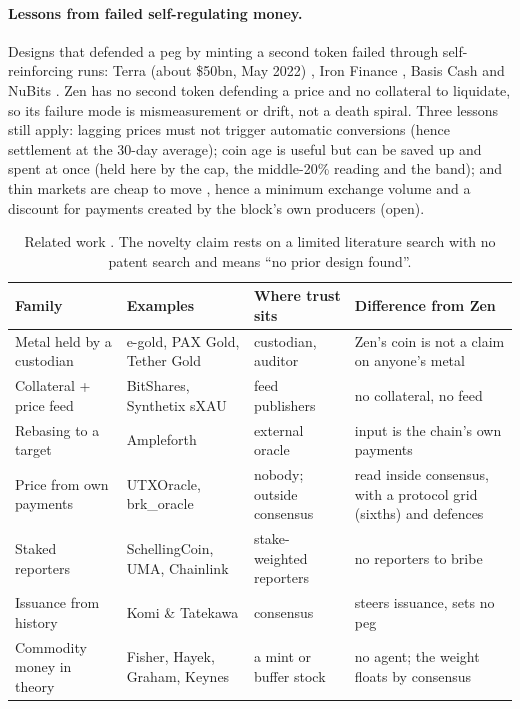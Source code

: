 \paragraph{Lessons from failed self-regulating money.} Designs that defended a peg by minting a second token failed through self-reinforcing runs: Terra (about \$50bn, May 2022) \cite{terra}, Iron Finance \cite{ironfinance}, Basis Cash \cite{basiscash} and NuBits \cite{nubits}. Zen has no second token defending a price and no collateral to liquidate, so its failure mode is mismeasurement or drift, not a death spiral. Three lessons still apply: lagging prices must not trigger automatic conversions (hence settlement at the 30-day average); coin age is useful but can be saved up and spent at once (held here by the cap, the middle-20\% reading and the band); and thin markets are cheap to move \cite{mango,uniswap}, hence a minimum exchange volume and a discount for payments created by the block's own producers (open).

\begin{table}[htbp]
\centering\footnotesize
\begin{tabularx}{\textwidth}{>{\raggedright\arraybackslash}p{3.0cm} Y Y Y}
\toprule
\textbf{Family} & \textbf{Examples} & \textbf{Where trust sits} & \textbf{Difference from Zen}\\
\midrule
Metal held by a custodian & e-gold, PAX Gold, Tether Gold & custodian, auditor & Zen's coin is not a claim on anyone's metal\\
Collateral + price feed & BitShares, Synthetix sXAU & feed publishers & no collateral, no feed\\
Rebasing to a target & Ampleforth & external oracle & input is the chain's own payments\\
Price from own payments & UTXOracle, brk\_oracle & nobody; outside consensus & read inside consensus, with a protocol grid (sixths) and defences\\
Staked reporters & SchellingCoin, UMA, Chainlink & stake-weighted reporters & no reporters to bribe\\
Issuance from history & Komi \& Tatekawa & consensus & steers issuance, sets no peg\\
Commodity money in theory & Fisher, Hayek, Graham, Keynes & a mint or buffer stock & no agent; the weight floats by consensus\\
\bottomrule
\end{tabularx}
\caption{Related work \cite{egold,paxg,bitusd,synthetix,ampleforth,utxoracle,brk,schellingcoin,komi,hayek,ussher}. The novelty claim rests on a limited literature search with no patent search and means ``no prior design found''.}
\label{tab:related}
\end{table}

